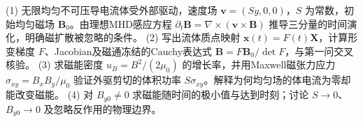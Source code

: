 (1) 无限均匀不可压导电流体受外部驱动，速度场 \(\boldsymbol v=(Sy,0,0)\)，\(S\) 为常数，初始均匀磁场 \(\boldsymbol B_0\)。由理想MHD感应方程 \(\partial_t\boldsymbol B=\nabla\times(\boldsymbol v\times\boldsymbol B)\) 推导三分量的时间演化，明确磁扩散被忽略的条件。
(2) 写出流体质点映射 \(\boldsymbol x(t)=F(t)\boldsymbol X\)，计算形变梯度 \(F\)、Jacobian及磁通冻结的Cauchy表达式 \(\boldsymbol B=F\boldsymbol B_0/\det F\)，与第一问交叉核验。
(3) 求磁能密度 \(u_B=B^2/(2\mu_0)\) 的增长率，并用Maxwell磁张力应力 \(\sigma_{xy}=B_xB_y/\mu_0\) 验证外驱剪切的体积功率 \(S\sigma_{xy}\)。解释为何均匀场的体电流为零却能改变磁能。
(4) 对 \(B_{y0}\ne0\) 求磁能随时间的极小值与达到时刻；讨论 \(S\to0\)、\(B_{y0}\to0\) 及忽略反作用的物理边界。
